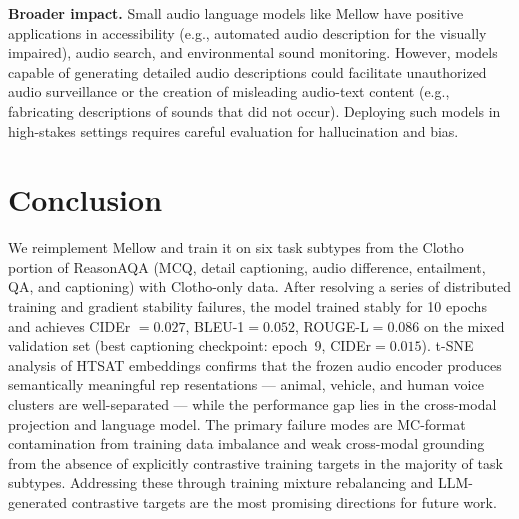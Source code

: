 \documentclass[cameraready]{Interspeech}
\begin{document}
\textbf{Broader impact.}
Small audio language models like Mellow have positive applications in accessibility (e.g.,
automated audio description for the visually impaired), audio search, and environmental sound
monitoring. However, models capable of generating detailed audio descriptions could
facilitate unauthorized audio surveillance or the creation of misleading audio-text content
(e.g., fabricating descriptions of sounds that did not occur). Deploying such models in
high-stakes settings requires careful evaluation for hallucination and bias.

\section{Conclusion}
\label{sec:conclusion}

We reimplement Mellow and train it on six task subtypes from the Clotho portion of ReasonAQA (MCQ, detail captioning, audio difference, entailment, QA, and captioning) with Clotho-only data. After resolving a series of distributed training and gradient stability failures, the model trained stably for 10 epochs and achieves CIDEr $=0.027$, BLEU-1$=0.052$, ROUGE-L$=0.086$ on the mixed validation set (best captioning checkpoint: epoch~9, CIDEr$=0.015$). t-SNE analysis of HTSAT embeddings confirms that the frozen audio encoder produces semantically meaningful rep resentations — animal, vehicle, and human voice clusters are well-separated — while the performance gap lies in the cross-modal projection and language model. The primary failure modes are MC-format contamination from training data imbalance and weak cross-modal grounding from the absence of explicitly contrastive training targets in the majority of task subtypes. Addressing these through training mixture rebalancing and LLM-generated contrastive targets are the most promising directions for future work.




\end{document}
